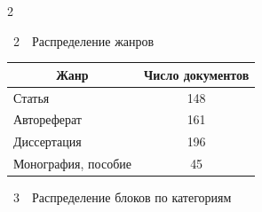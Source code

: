 \begin{multicols}{2}
{\small %


    \begin{center}


    \vspace*{6pt}


    


    \noindent


{{\tablename~2}\ \ \small{Распределение жанров}}







\vspace*{2ex}





    \begin{tabular}{|l|c|}


        \hline


       \multicolumn{1}{|c|}{Жанр} & Число документов \\ 


        \hline


        Статья & 148 \\ 




        Автореферат & 161 \\ 




        Диссертация & 196 \\ 




        Монография, пособие & \hphantom{9}45 \\


        \hline


    \end{tabular}


    \end{center}}






{\small %


\vspace*{3pt}


\begin{center}


  \noindent


{{\tablename~3}\ \ \small{Распределение блоков по категориям}}






\end{center}}
\end{multicols}
